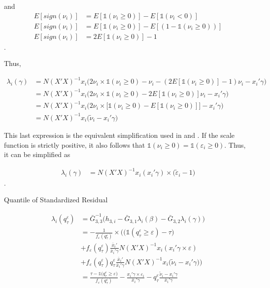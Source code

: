 \documentclass[
  authoryear,
  review,
  1p]{elsarticle}
\begin{document}
and \[\begin{aligned}
E[sign(\nu_i)] &= E[\mathbb{1}(\nu_i \geq 0)] - E[\mathbb{1}(\nu_i < 0)] \\
E[sign(\nu_i)] &= E[\mathbb{1}(\nu_i \geq 0)] - E[(1-\mathbb{1}(\nu_i \geq 0))] \\
E[sign(\nu_i)] &= 2 E[\mathbb{1}(\nu_i \geq 0)] - 1
\end{aligned}
\].

Thus,

\[\begin{aligned}
\lambda_i(\gamma) &= N(X'X)^{-1} x_i   \Big( 2 \nu_i \times \mathbb{1}(\nu_i \geq 0) - \nu_i  - ( 2 E[\mathbb{1}(\nu_i \geq 0)] - 1) \nu_i -x_i' \gamma \Big) \\
  &= N(X'X)^{-1} x_i   \Big( 2 \nu_i \times \mathbb{1}(\nu_i \geq 0) -  2 E[\mathbb{1}(\nu_i \geq 0)] \nu_i -x_i' \gamma \Big) \\
  &= N(X'X)^{-1} x_i   \Big( 2 \nu_i \times \big[ \mathbb{1}(\nu_i \geq 0) -  E[\mathbb{1}(\nu_i \geq 0)] \big] -x_i'\gamma \Big) \\
  &= N(X'X)^{-1} x_i   \Big( \tilde \nu_i -x_i' 
  \gamma \Big)
\end{aligned}
\]

This last expression is the equivalent simplification used in
\citet{mss2019} and \citet{im2000}. If the scale function is strictly
positive, it also follows that
\(\mathbb{1}(\nu_i \geq 0)= \mathbb{1}(\varepsilon_i \geq 0)\). Thus, it
can be simplified as

\[\begin{aligned}
\lambda_i(\gamma) &= N(X'X)^{-1} x_i ( x_i' \gamma ) \times (\tilde \varepsilon_i -1\big)
\end{aligned}
\].

Quantile of Standardized Residual

\[\begin{aligned}
\lambda_i(q^\varepsilon_\tau)&=\bar G_{3,3}^{-1}
\Big(
 h_{3,i}-\bar G_{3,1} \lambda_i(\beta)-\bar G_{3,2} \lambda_i(\gamma)
\Big) \\
&=-\frac{1}{f_{\varepsilon}(q^\varepsilon_\tau)} \times \Bigg( \Big(\mathbb{1} ( q^\varepsilon_\tau  \geq \varepsilon  ) - \tau \Big)  \\
&+ f_{\varepsilon} (q^\varepsilon_\tau) \frac{\bar x_i'}{\bar x_i'\gamma} 
N (X'X)^{-1} x_i  ( x_i'\gamma \times \varepsilon) \\
&+ f_{\varepsilon}(q^\varepsilon_\tau) q^\varepsilon_\tau \frac{\bar x_i'}{\bar x_i'\gamma} N(X'X)^{-1} x_i   \big( \tilde \nu_i -x_i' 
  \gamma \big) 
\Bigg) \\
&=\frac{\tau-\mathbb{1}\big( q^\varepsilon_\tau  \geq \varepsilon  \big) }{f_{\varepsilon}(q^\varepsilon_\tau)}
- \frac{ x_i'\gamma \times \varepsilon_i }{\bar x_i'\gamma} 
-  q^\varepsilon_\tau \frac{ \tilde \nu_i -x_i' 
  \gamma }{\bar x_i'\gamma} 
\end{aligned}
\]
\end{document}
